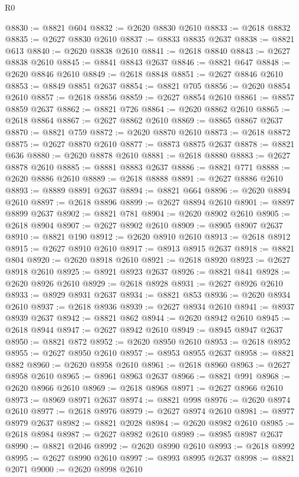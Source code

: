 \begin{lexlean}{R0}
\begin{coremodule}
@8830 := @8821 @604
@8832 := @2620 @8830 @2610
@8833 := @2618 @8832
@8835 := @2627 @8830 @2610
@8837 := @8833 @8835 @2637
@8838 := @8821 @613
@8840 := @2620 @8838 @2610
@8841 := @2618 @8840
@8843 := @2627 @8838 @2610
@8845 := @8841 @8843 @2637
@8846 := @8821 @647
@8848 := @2620 @8846 @2610
@8849 := @2618 @8848
@8851 := @2627 @8846 @2610
@8853 := @8849 @8851 @2637
@8854 := @8821 @705
@8856 := @2620 @8854 @2610
@8857 := @2618 @8856
@8859 := @2627 @8854 @2610
@8861 := @8857 @8859 @2637
@8862 := @8821 @726
@8864 := @2620 @8862 @2610
@8865 := @2618 @8864
@8867 := @2627 @8862 @2610
@8869 := @8865 @8867 @2637
@8870 := @8821 @759
@8872 := @2620 @8870 @2610
@8873 := @2618 @8872
@8875 := @2627 @8870 @2610
@8877 := @8873 @8875 @2637
@8878 := @8821 @636
@8880 := @2620 @8878 @2610
@8881 := @2618 @8880
@8883 := @2627 @8878 @2610
@8885 := @8881 @8883 @2637
@8886 := @8821 @771
@8888 := @2620 @8886 @2610
@8889 := @2618 @8888
@8891 := @2627 @8886 @2610
@8893 := @8889 @8891 @2637
@8894 := @8821 @664
@8896 := @2620 @8894 @2610
@8897 := @2618 @8896
@8899 := @2627 @8894 @2610
@8901 := @8897 @8899 @2637
@8902 := @8821 @781
@8904 := @2620 @8902 @2610
@8905 := @2618 @8904
@8907 := @2627 @8902 @2610
@8909 := @8905 @8907 @2637
@8910 := @8821 @190
@8912 := @2620 @8910 @2610
@8913 := @2618 @8912
@8915 := @2627 @8910 @2610
@8917 := @8913 @8915 @2637
@8918 := @8821 @804
@8920 := @2620 @8918 @2610
@8921 := @2618 @8920
@8923 := @2627 @8918 @2610
@8925 := @8921 @8923 @2637
@8926 := @8821 @841
@8928 := @2620 @8926 @2610
@8929 := @2618 @8928
@8931 := @2627 @8926 @2610
@8933 := @8929 @8931 @2637
@8934 := @8821 @853
@8936 := @2620 @8934 @2610
@8937 := @2618 @8936
@8939 := @2627 @8934 @2610
@8941 := @8937 @8939 @2637
@8942 := @8821 @862
@8944 := @2620 @8942 @2610
@8945 := @2618 @8944
@8947 := @2627 @8942 @2610
@8949 := @8945 @8947 @2637
@8950 := @8821 @872
@8952 := @2620 @8950 @2610
@8953 := @2618 @8952
@8955 := @2627 @8950 @2610
@8957 := @8953 @8955 @2637
@8958 := @8821 @882
@8960 := @2620 @8958 @2610
@8961 := @2618 @8960
@8963 := @2627 @8958 @2610
@8965 := @8961 @8963 @2637
@8966 := @8821 @991
@8968 := @2620 @8966 @2610
@8969 := @2618 @8968
@8971 := @2627 @8966 @2610
@8973 := @8969 @8971 @2637
@8974 := @8821 @998
@8976 := @2620 @8974 @2610
@8977 := @2618 @8976
@8979 := @2627 @8974 @2610
@8981 := @8977 @8979 @2637
@8982 := @8821 @2028
@8984 := @2620 @8982 @2610
@8985 := @2618 @8984
@8987 := @2627 @8982 @2610
@8989 := @8985 @8987 @2637
@8990 := @8821 @2046
@8992 := @2620 @8990 @2610
@8993 := @2618 @8992
@8995 := @2627 @8990 @2610
@8997 := @8993 @8995 @2637
@8998 := @8821 @2071
@9000 := @2620 @8998 @2610

\end{coremodule}
\end{lexlean}
